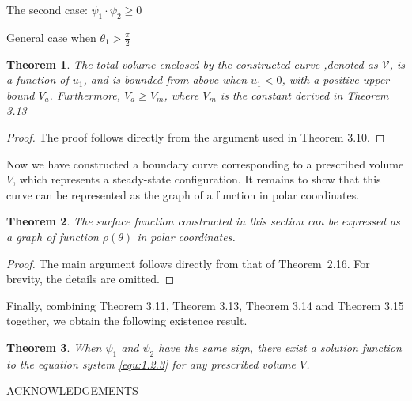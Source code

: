 \documentclass[letterpaper,reqno,10pt,twoside]{amsart}
\newtheorem{theorem}{Theorem}[section]
\theoremstyle{definition}
\theoremstyle{remark}
\begin{document}
\begin{section}{The second case: $\psi_1\cdot \psi_2\geq 0$ }
\begin{subsection}{General case when $\theta_1>\frac{\pi}{2}$}
            \begin{theorem}
            The total volume enclosed by the constructed curve ,denoted as $\mathscr{V}$, is a function of $u_1$, and is bounded from above when $u_1<0$, with a positive upper bound $V_a$. Furthermore, $V_a\geq V_m$, where $V_{m}$ is the constant derived in Theorem 3.13
            \end{theorem}

            \begin{proof}

                The proof follows directly from the argument used in Theorem 3.10. 
            \end{proof}

            Now we have constructed a boundary curve corresponding to a prescribed volume $V$, which represents a steady-state configuration. It remains to show that this curve can be represented as the graph of a function in polar coordinates.

            \begin{theorem}
                The surface function constructed in this section can be expressed as a graph of function $\rho(\theta)$ in polar coordinates.
            \end{theorem}

            \begin{proof}

                The main argument follows directly from that of Theorem~2.16. For brevity, the details are omitted.
            \end{proof}
            
            Finally, combining Theorem 3.11, Theorem 3.13, Theorem 3.14 and Theorem 3.15 together, we obtain the following existence result.

            \begin{theorem}
            
            When $\psi_1$ and $\psi_2$ have the same sign, there exist a solution function to the equation system \eqref{equ:1.2.3} for any prescribed volume $V$.
            \end{theorem}

        \end{subsection}

        
    \end{section}

    
    \begin{center}
        {\large A}CKNOWLEDGEMENTS
    \end{center}
\end{document}
